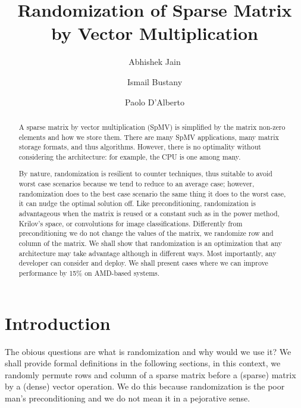 \documentclass[manuscript,screen]{acmart}
\begin{document}
\title{Randomization of Sparse Matrix by Vector Multiplication }

\author{Abhishek Jain}
\author{Ismail Bustany}
\author{Paolo D'Alberto}


\renewcommand{\shortauthors}{Jain et al.}

\begin{abstract}
A sparse matrix by vector multiplication (SpMV) is simplified by the
matrix non-zero elements and how we store them. There are many SpMV
applications, many matrix storage formats, and thus
algorithms. However, there is no optimality without considering the
architecture: for example, the CPU is one among many.

By nature, randomization is resilient to counter techniques, thus
suitable to avoid worst case scenarios because we tend to reduce to an
average case; however, randomization does to the best case scenario
the same thing it does to the worst case, it can nudge the optimal
solution off. Like preconditioning, randomization is advantageous when
the matrix is reused or a constant such as in the power method,
Krilov's space, or convolutions for image classifications. Differently
from preconditioning we do not change the values of the matrix, we
randomize row and column of the matrix. We shall show that
randomization is an optimization that any architecture may take
advantage although in different ways. Most importantly, any developer
can consider and deploy. We shall present cases where we can improve
performance by 15\% on AMD-based systems.

\end{abstract}

\maketitle

\section{Introduction} 
\label{sec:introduction}

The obious questions are what is randomization and why would we use
it? We shall provide formal definitions in the following sections, in
this context, we randomly permute rows and column of a sparse matrix
before a (sparse) matrix by a (dense) vector operation. We do this
because randomization is the poor man's preconditioning and we do not
mean it in a pejorative sense.
\end{document}

